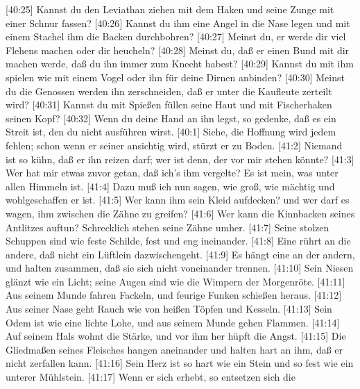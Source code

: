  {[}40:25{]} Kannst du den Leviathan ziehen mit dem Haken
und seine Zunge mit einer Schnur fassen?  {[}40:26{]} Kannst
du ihm eine Angel in die Nase legen und mit einem Stachel ihm die Backen
durchbohren?  {[}40:27{]} Meinst du, er werde dir viel
Flehens machen oder dir heucheln?  {[}40:28{]} Meinst du,
daß er einen Bund mit dir machen werde, daß du ihn immer zum Knecht
habest?  {[}40:29{]} Kannst du mit ihm spielen wie mit einem
Vogel oder ihn für deine Dirnen anbinden?  {[}40:30{]}
Meinst du die Genossen werden ihn zerschneiden, daß er unter die
Kaufleute zerteilt wird?  {[}40:31{]} Kannst du mit Spießen
füllen seine Haut und mit Fischerhaken seinen Kopf? 
{[}40:32{]} Wenn du deine Hand an ihn legst, so gedenke, daß es ein
Streit ist, den du nicht ausführen wirst.  {[}40:1{]} Siehe,
die Hoffnung wird jedem fehlen; schon wenn er seiner ansichtig wird,
stürzt er zu Boden.  {[}41:2{]} Niemand ist so kühn, daß er
ihn reizen darf; wer ist denn, der vor mir stehen könnte? 
{[}41:3{]} Wer hat mir etwas zuvor getan, daß ich's ihm vergelte? Es ist
mein, was unter allen Himmeln ist.  {[}41:4{]} Dazu muß ich
nun sagen, wie groß, wie mächtig und wohlgeschaffen er ist.
 {[}41:5{]} Wer kann ihm sein Kleid aufdecken? und wer darf
es wagen, ihm zwischen die Zähne zu greifen?  {[}41:6{]}
Wer kann die Kinnbacken seines Antlitzes auftun? Schrecklich stehen
seine Zähne umher.  {[}41:7{]} Seine stolzen Schuppen sind
wie feste Schilde, fest und eng ineinander.  {[}41:8{]}
Eine rührt an die andere, daß nicht ein Lüftlein dazwischengeht.
 {[}41:9{]} Es hängt eine an der andern, und halten
zusammen, daß sie sich nicht voneinander trennen. 
{[}41:10{]} Sein Niesen glänzt wie ein Licht; seine Augen sind wie die
Wimpern der Morgenröte.  {[}41:11{]} Aus seinem Munde
fahren Fackeln, und feurige Funken schießen heraus. 
{[}41:12{]} Aus seiner Nase geht Rauch wie von heißen Töpfen und
Kesseln.  {[}41:13{]} Sein Odem ist wie eine lichte Lohe,
und aus seinem Munde gehen Flammen.  {[}41:14{]} Auf seinem
Hals wohnt die Stärke, und vor ihm her hüpft die Angst. 
{[}41:15{]} Die Gliedmaßen seines Fleisches hangen aneinander und halten
hart an ihm, daß er nicht zerfallen kann.  {[}41:16{]} Sein
Herz ist so hart wie ein Stein und so fest wie ein unterer Mühlstein.
 {[}41:17{]} Wenn er sich erhebt, so entsetzen sich die
